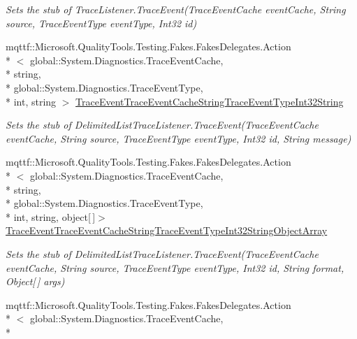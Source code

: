 \begin{DoxyCompactItemize}
\begin{DoxyCompactList}\small\item\em Sets the stub of Trace\-Listener.\-Trace\-Event(\-Trace\-Event\-Cache event\-Cache, String source, Trace\-Event\-Type event\-Type, Int32 id)\end{DoxyCompactList}\item 
mqttf\-::\-Microsoft.\-Quality\-Tools.\-Testing.\-Fakes.\-Fakes\-Delegates.\-Action\\*
$<$ global\-::\-System.\-Diagnostics.\-Trace\-Event\-Cache, \\*
string, \\*
global\-::\-System.\-Diagnostics.\-Trace\-Event\-Type, \\*
int, string $>$ \hyperlink{class_system_1_1_diagnostics_1_1_fakes_1_1_stub_delimited_list_trace_listener_af7d1a9229c2193b06bafd6b49c48cc01}{Trace\-Event\-Trace\-Event\-Cache\-String\-Trace\-Event\-Type\-Int32\-String}
\begin{DoxyCompactList}\small\item\em Sets the stub of Delimited\-List\-Trace\-Listener.\-Trace\-Event(\-Trace\-Event\-Cache event\-Cache, String source, Trace\-Event\-Type event\-Type, Int32 id, String message)\end{DoxyCompactList}\item 
mqttf\-::\-Microsoft.\-Quality\-Tools.\-Testing.\-Fakes.\-Fakes\-Delegates.\-Action\\*
$<$ global\-::\-System.\-Diagnostics.\-Trace\-Event\-Cache, \\*
string, \\*
global\-::\-System.\-Diagnostics.\-Trace\-Event\-Type, \\*
int, string, object\mbox{[}$\,$\mbox{]}$>$ \hyperlink{class_system_1_1_diagnostics_1_1_fakes_1_1_stub_delimited_list_trace_listener_a06ac5a82c4505c2dc00116fbaad2445e}{Trace\-Event\-Trace\-Event\-Cache\-String\-Trace\-Event\-Type\-Int32\-String\-Object\-Array}
\begin{DoxyCompactList}\small\item\em Sets the stub of Delimited\-List\-Trace\-Listener.\-Trace\-Event(\-Trace\-Event\-Cache event\-Cache, String source, Trace\-Event\-Type event\-Type, Int32 id, String format, Object\mbox{[}$\,$\mbox{]} args)\end{DoxyCompactList}\item 
mqttf\-::\-Microsoft.\-Quality\-Tools.\-Testing.\-Fakes.\-Fakes\-Delegates.\-Action\\*
$<$ global\-::\-System.\-Diagnostics.\-Trace\-Event\-Cache, \\*

\end{DoxyCompactItemize}
